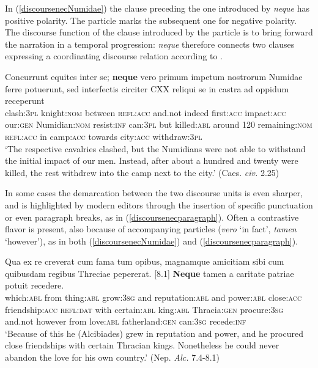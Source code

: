 \documentclass[output=paper,modfonts,nonflat,citecolor=brown,
showindex
]{langsci/langscibook}
\begin{document}
In (\ref{discoursenecNumidae}) the clause preceding the one introduced by {\emph{neque}} has positive polarity. The particle marks the subsequent one for negative polarity. The discourse function of the clause introduced by the particle is to bring forward the narration in a temporal progression: {\emph{neque}} therefore connects two clauses expressing a coordinating discourse relation according to \citet[]{Asher93}.

{\begin{exe}
\ex \label{discoursenecNumidae} \gll Concurrunt equites inter se; {\textbf{neque}} vero primum impetum nostrorum Numidae ferre potuerunt, sed interfectis circiter CXX reliqui se in castra ad oppidum receperunt\\
clash:{\textsc{3pl}} knight:{\textsc{nom}} between {\textsc{refl}}:{\textsc{acc}} and.not indeed first:{\textsc{acc}} impact:{\textsc{acc}} our:{\textsc{gen}} Numidian:{\textsc{nom}} resist:{\textsc{inf}} can:{\textsc{3pl}} but killed:{\textsc{abl}} around 120 remaining:{\textsc{nom}} {\textsc{refl}}:{\textsc{acc}} in camp:{\textsc{acc}} towards city:{\textsc{acc}} withdraw:{\textsc{3pl}}\\

`The respective cavalries clashed, but the Numidians were not able to withstand the initial impact of our men. Instead, after about a hundred and twenty were killed, the rest withdrew into the camp next to the city.' (Caes. {\emph{civ.}} 2.25)
\end{exe}}

\noindent In some cases the demarcation between the two discourse units is even sharper, and is highlighted by modern editors through the insertion of specific punctuation or even paragraph breaks, as in (\ref{discoursenecparagraph}). Often a contrastive flavor is present, also because of accompanying particles ({\emph{vero}} `in fact', {\emph{tamen}} `however'), as in both (\ref{discoursenecNumidae}) and (\ref{discoursenecparagraph}).

{\begin{exe}
\ex \label{discoursenecparagraph} \gll [7.4] Qua ex re creverat cum fama tum opibus, magnamque amicitiam sibi cum quibusdam regibus Threciae pepererat. [8.1] {\textbf{Neque}} tamen a caritate patriae potuit recedere.\\
\hspace{10 mm} which:{\textsc{abl}} from thing:{\textsc{abl}} grow:{\textsc{3sg}} and reputation:{\textsc{abl}} and power:{\textsc{abl}} close:{\textsc{acc}} friendship:{\textsc{acc}} {\textsc{refl:dat}} with certain:{\textsc{abl}} king:{\textsc{abl}} Thracia:{\textsc{gen}} procure:{\textsc{3sg}} \hspace{10 mm} and.not however from love:{\textsc{abl}} fatherland:{\textsc{gen}} can:{\textsc{3sg}} recede:{\textsc{inf}}\\

`Because of this he (Alcibiades) grew in reputation and power, and he procured close friendships with certain Thracian kings. Nonetheless he could never abandon the love for his own country.'
(Nep. {\emph{Alc.}} 7.4-8.1)
\end{exe}}
\end{document}
